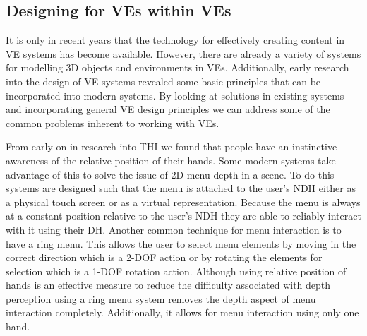 \documentclass{sig-alternate-05-2015}
\begin{document}
\subsection{Designing for VEs within VEs}
It is only in recent years that the technology for effectively creating content in VE systems has become available. However, there are already a variety of systems for modelling 3D objects and environments in VEs. Additionally, early research into the design of VE systems revealed some basic principles that can be incorporated into modern systems. By looking at solutions in existing systems and incorporating general VE design principles we can address some of the common problems inherent to working with VEs.

From early on in research into THI we found that people have an instinctive awareness of the relative position of their hands\cite{Bowman1998, Buxton1986}. Some modern systems take advantage of this to solve the issue of 2D menu depth in a scene. To do this systems are designed such that the menu is attached to the user's NDH either as a physical touch screen\cite{Wang2013,Mine2014} or as a virtual representation\cite{Jerald2013}. Because the menu is always at a constant position relative to the user's NDH they are able to reliably interact with it using their DH. Another common technique for menu interaction is to have a ring menu. This allows the user to select menu elements by moving in the correct direction\cite{Brooks2012} which is a 2-DOF action or by rotating the elements for selection which is a 1-DOF rotation action\cite{Hand1997}. Although using relative position of hands is an effective measure to reduce the difficulty associated with depth perception using a ring menu system removes the depth aspect of menu interaction completely. Additionally, it allows for menu interaction using only one hand.
\end{document}
